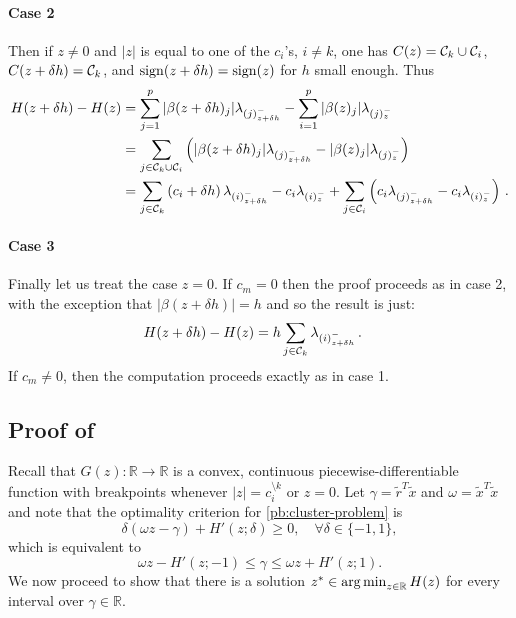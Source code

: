 \paragraph{Case 2}
Then if  $z \neq 0$ and $|z|$ is equal to one of the $c_i$'s, $i \neq k$,  one has $C(z) = \mathcal{C}_k \cup \mathcal{C}_i$, $C(z + \delta h) = \mathcal{C}_k$, and $\operatorname{sign}(z + \delta h) = \operatorname{sign}(z)$ for $h$ small enough.
Thus
\begin{align}
  H(z + \delta h) - H(z)
   & = \sum_{j =1}^p |\beta(z + \delta h)_j| \lambda_{(j)^-_{z + \delta h}}
  - \sum_{i=1}^p |\beta(z)_j| \lambda_{(j)^-_z}  \nonumber                                         \\
   & = \sum_{j \in \mathcal{C}_k \cup \mathcal{C}_i} \left( |\beta(z + \delta h)_j| \lambda_{(j)^-_{z + \delta h}}
  - |\beta(z)_j| \lambda_{(j)^-_z} \right)  \nonumber                                              \\
   & = \sum_{j \in \mathcal{C}_k} \left( c_i + \delta h \right) \lambda_{(i)^-_{z + \delta h}}
  - c_i \lambda_{(i)^-_z}
  + \sum_{j \in \mathcal{C}_i} \left( c_i \lambda_{(j)^-_{z + \delta h}}
    - c_i \lambda_{(i)^-_z} \right) \, .
\end{align}

\paragraph{Case 3} Finally let us treat the case $z = 0$.
If $c_m = 0$ then the proof proceeds as in case 2, with the exception that $|\beta(z + \delta h)| = h$ and so the result is just:
\begin{align}
  H(z + \delta h) - H(z)
   & = h \sum_{j \in \mathcal{C}_k} \lambda_{(i)^-_{z + \delta h}} \, .
\end{align}
If $c_m \neq 0$, then the computation proceeds exactly as in case 1.

\subsection{Proof of }

Recall that \(G(z) : \mathbb{R} \to \mathbb{R}\) is a convex,
continuous piecewise-differentiable function with breakpoints whenever \(|z| =
c_i^{\setminus k}\) or \(z = 0\). Let \(\gamma = \tilde{r}^T\tilde{x}\)
and \(\omega = \tilde{x}^T\tilde{x}\) and note that the optimality criterion for
\eqref{pb:cluster-problem} is
\[
  \delta(\omega z - \gamma) + H'(z; \delta) \geq 0, \quad
  \forall \delta \in \{-1, 1\},
\]
which is equivalent to
\begin{equation}
  \label{eq:optimality-inequality}
  \omega z - H'(z; -1) \leq \gamma \leq \omega z + H'(z; 1).
\end{equation}
We now proceed to show that there is a solution \(z^* \in \operatorname*{arg\,min}_{z \in
  \mathbb{R}} H(z)\) for every interval over \(\gamma \in \mathbb{R}\).

